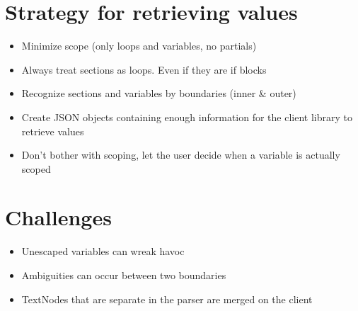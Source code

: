 \section{Strategy for retrieving values}
\begin{itemize}
\item Minimize scope (only loops and variables, no partials)
\item Always treat sections as loops. Even if they are if blocks
\item Recognize sections and variables by boundaries (inner \& outer)
\item Create JSON objects containing enough information for the client library to retrieve values
\item Don't bother with scoping, let the user decide when a variable is actually scoped
\end{itemize}

\section{Challenges}
\begin{itemize}
\item Unescaped variables can wreak havoc
\item Ambiguities can occur between two boundaries
\item TextNodes that are separate in the parser are merged on the client
\end{itemize}
